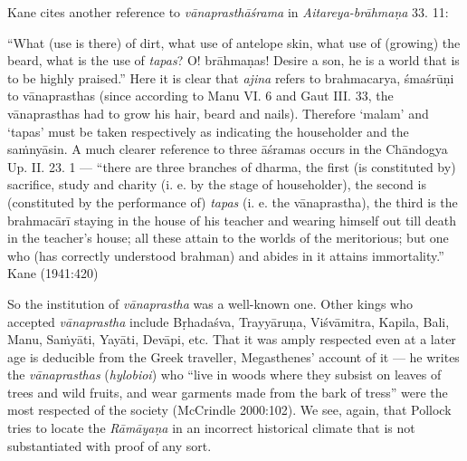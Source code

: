 Kane cites another reference to {\sl vānaprasthāśrama} in {\sl Aitareya-brāhmaṇa}
 33. 11:

\begin{myquote}
“What (use is there) of dirt, what use of antelope skin, what use of (growing) the beard, what is the use of {\sl tapas}? O! brāhmaṇas! Desire a son, he is a world that is to be highly praised.” Here it is clear that {\sl ajina} refers to brahmacarya, śmaśrūṇi to vānaprasthas (since according to Manu VI. 6 and Gaut III. 33, the vānaprasthas had to grow his hair, beard and nails). Therefore `malam’ and `tapas' must be taken respectively as indicating the householder and the saṁnyāsin. A much clearer reference to three āśramas occurs in the Chāndogya Up. II. 23. 1 --- “there are three branches of dharma, the first (is constituted by) sacrifice, study and charity (i. e. by the stage of householder), the second is (constituted by the performance of) {\sl tapas} (i. e. the vānaprastha), the third is the brahmacārī staying in the house of his teacher and wearing himself out till death in the teacher's house; all these attain to the worlds of the meritorious; but one who (has correctly understood brahman) and abides in it attains immortality.”
\hfill Kane (1941:420)
\end{myquote}

So the institution of {\sl vānaprastha} was a well-known one. Other kings who accepted {\sl vānaprastha} include Bṛhadaśva, Trayyāruṇa, Viśvāmitra, Kapila, Bali, Manu, Saṁyāti, Yayāti, Devāpi, etc. That it was amply respected even at a later age is deducible from the Greek traveller, Megasthenes’ account of it --- he writes the {\sl vānaprasthas} ({\sl hylobioi}) who “live in woods where they subsist on leaves of trees and wild fruits, and wear garments made from the bark of tress” were the most respected of the society (McCrindle 2000:102).  We see, again, that Pollock tries to locate the {\sl Rāmāyaṇa} in an incorrect historical climate that is not substantiated with proof of any sort.\\[-21pt] 
\vskip 4pt

